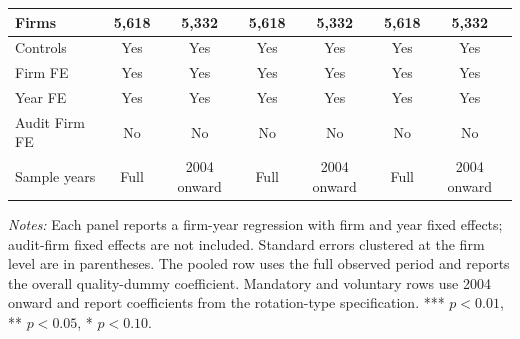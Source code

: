 \documentclass[10pt]{article}
\begin{document}
\begin{minipage}{19cm}
\begin{threeparttable}
\begin{tabular}{l cc cc cc}
Firms & 5,618 & 5,332 & 5,618 & 5,332 & 5,618 & 5,332 \\
\midrule
Controls & Yes & Yes & Yes & Yes & Yes & Yes \\
Firm FE & Yes & Yes & Yes & Yes & Yes & Yes \\
Year FE & Yes & Yes & Yes & Yes & Yes & Yes \\
Audit Firm FE & No & No & No & No & No & No \\
Sample years & Full & 2004 onward & Full & 2004 onward & Full & 2004 onward \\
\bottomrule
\end{tabular}
\begin{tablenotes}\fontsize{9}{11}\selectfont
\item \fontsize{9}{11}\selectfont \textit{Notes:} Each panel reports a firm-year regression with firm and year fixed effects; audit-firm fixed effects are not included. Standard errors clustered at the firm level are in parentheses. The pooled row uses the full observed period and reports the overall quality-dummy coefficient. Mandatory and voluntary rows use 2004 onward and report coefficients from the rotation-type specification. *** \(p<0.01\), ** \(p<0.05\), * \(p<0.10\).
\end{tablenotes}
\end{threeparttable}

\end{minipage}
\end{document}
